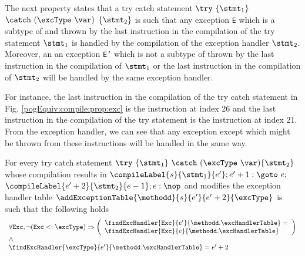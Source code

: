 The next property states that a try catch statement $ \try \ \{ \stmt_1 \} $ $ \catch \ (\excType \ \var )$ $\{ \stmt_2 \}  $  is such that
any exception \texttt{E} which is a subtype of \excType{} and thrown by  the last instruction in the compilation of the try statement $ \stmt_1 $ is handled by the 
compilation of the exception handler $\stmt_2$. Moreover, an 
 an exception \texttt{E'} which is not a subtype of \excType{} thrown by the  last instruction in the compilation of $\stmt_1$
or the last instruction  in the compilation of $\stmt_2$ will be handled by the same exception handler. 

For instance, the last instruction in the compilation of the try catch statement  in Fig. \ref{pogEquiv:compile:prop:exc} 
is the instruction at index 26 and the last instruction in the compilation of the try statement is the instruction at index 21. 
From the exception handler, we can see that any exception except \NullPointerExc{} which might be thrown from these instructions 
will be handled in the same way. 
 
\begin{compProp}\label{compile:prop:compProp10}
For every try catch statement $ \try \ \{ \stmt_1 \} \ \catch \ (\excType \ \var )\{ \stmt_2 \}  $ 
whose compilation  results in 
$ \compileLabel{s}{\stmt_1}{e'}; e' + 1: \goto \ e;  $ $\compileLabel{e' + 2 }{\stmt_2}{e - 1}; e: \nop$
and modifies the exception handler table  
	$\addExceptionTable{\methodd}{ s }{ e'  }{ e' + 2 }{\excType} $
is such that the following holds 
$$\begin{array}{l} \forall \mbox{\rm{\texttt{Exc}}},  \neg ( \mbox{\rm{\texttt{Exc}}} <: \excType ) \Rightarrow
  \left( \begin{array}{l}  
         \findExcHandler{\mbox{\rm\tt{Exc}} }{e'}{\methodd.\excHandlerTable} =\\ 
    \findExcHandler{\mbox{\rm\tt{Exc}} }{e}{\methodd.\excHandlerTable}  \\
   \end{array}\right) \\
   \wedge\\
  \findExcHandler{\excType }{e'}{\methodd.\excHandlerTable} = e'+2 \\ 
 \end{array} $$

\end{compProp}

